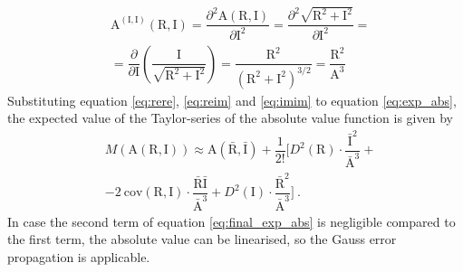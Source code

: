 \documentclass[a4paper,12pt,oneside]{article}
\newcommand{\Abs}{\mathrm{A}}
\newcommand{\R}{\mathrm{R}}
\newcommand{\I}{\mathrm{I}}
\begin{document}
\begin{eqnarray}\label{eq:imim}
  & \Abs^{(\I, \I)}(\R, \I) = \dfrac{\partial^2 \Abs(\R, \I)}{\partial \I^2} = 
  \dfrac{\partial^2 \sqrt{\R^2 + \I^2}}{\partial \I^2} =  \nonumber\\
  & = \dfrac{\partial}{\partial \I} \left( \dfrac{\I}{\sqrt{\R^2 + \I^2}} \right) =
  \dfrac{\R^2}{(\R^2 + \I^2)^{3/2}} = \dfrac{\R^2}{\Abs^3}
\end{eqnarray}
Substituting equation \eqref{eq:rere}, \eqref{eq:reim} and \eqref{eq:imim} to equation \eqref{eq:exp_abs}, the expected value of the Taylor-series of the absolute value function is given by
\begin{eqnarray}\label{eq:final_exp_abs}
  & M \left( \Abs(\R, \I) \right) \approx \Abs(\bar{\R}, \bar{\I}) + \dfrac{1}{2!} \Bigg[ D^2(\R) \cdot \dfrac{\bar{\I}^2}{\bar{\Abs}^3} + \nonumber\\
  & - 2 \ \mathrm{cov}(\R, \I) \cdot \dfrac{\bar{\R}\bar{\I}}{\bar{\Abs}^3} + D^2(\I) \cdot \dfrac{\bar{\R}^2}{\bar{\Abs}^3} \Bigg] \ .
\end{eqnarray}
In case the second term of equation \eqref{eq:final_exp_abs} is negligible compared to the first term, the absolute value can be linearised, so the Gauss error propagation is applicable.
\end{document}
